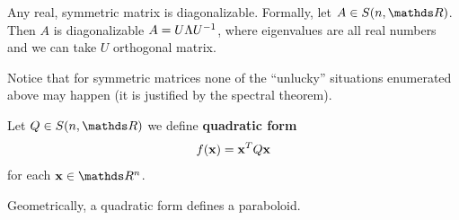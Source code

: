 \documentclass[computationalMathematics.tex]{subfiles}
\begin{document}
\begin{theorem}
  Any real, symmetric matrix is diagonalizable.
  Formally, let $A \in S(n, \R)$. Then $A$ is diagonalizable $A = U\Lambda {U}^{-1}$, where eigenvalues are all real numbers and we can take $U$ orthogonal matrix.
\end{theorem}


Notice that for symmetric matrices none of the ``unlucky'' situations enumerated above may happen (it is justified by the spectral theorem).


\begin{definition}
  Let $Q \in S(n, \R)$ we define \textbf{quadratic form}
  \[
    f({\bf x }) = {{\bf x }}^{T} Q {\bf x }
  \]
  for each $\vect{x} \in \R^{n}$.
\end{definition}

Geometrically, a quadratic form defines a paraboloid.
\end{document}
